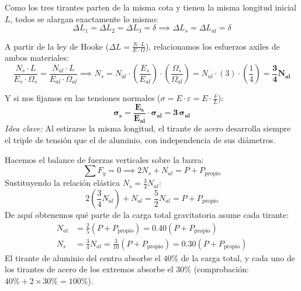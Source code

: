 Como los tres tirantes parten de la misma cota y tienen la misma longitud inicial $L$, todos se alargan exactamente lo mismo:
\begin{equation}
    \Delta L_1 = \Delta L_2 = \Delta L_3 = \delta \implies \Delta L_s = \Delta L_{al} = \delta
\end{equation}

A partir de la ley de Hooke ($\Delta L = \frac{N \cdot L}{E \cdot \Omega}$), relacionamos los esfuerzos axiles de ambos materiales:
\begin{equation}
    \frac{N_s \cdot L}{E_s \cdot \Omega_s} = \frac{N_{al} \cdot L}{E_{al} \cdot \Omega_{al}} \implies N_s = N_{al} \cdot \left(\frac{E_s}{E_{al}}\right) \cdot \left(\frac{\Omega_s}{\Omega_{al}}\right) = N_{al} \cdot (3) \cdot \left(\frac{1}{4}\right) = \mathbf{\frac{3}{4} N_{al}}
\end{equation}

Y si nos fijamos en las tensiones normales ($\sigma = E \cdot \varepsilon = E \cdot \frac{\delta}{L}$):
\begin{equation}
    \mathbf{\sigma_s = \frac{E_s}{E_{al}} \cdot \sigma_{al} = 3\,\sigma_{al}}
\end{equation}
\textit{Idea clave:} Al estirarse la misma longitud, el tirante de acero desarrolla siempre el triple de tensión que el de aluminio, con independencia de sus diámetros.


Hacemos el balance de fuerzas verticales sobre la barra:
\begin{equation}
    \sum F_y = 0 \implies 2 N_s + N_{al} = P + P_{\text{propio}}
\end{equation}
Sustituyendo la relación elástica $N_s = \frac{3}{4} N_{al}$:
\begin{equation}
    2\left(\frac{3}{4} N_{al}\right) + N_{al} = \frac{5}{2} N_{al} = P + P_{\text{propio}}
\end{equation}
De aquí obtenemos qué parte de la carga total gravitatoria asume cada tirante:
\begin{align}
    N_{al} & = \frac{2}{5}\left(P + P_{\text{propio}}\right) = 0.40\left(P + P_{\text{propio}}\right) \\
    N_s    & = \frac{3}{4} N_{al} = \frac{3}{10}\left(P + P_{\text{propio}}\right) = 0.30\left(P + P_{\text{propio}}\right)
\end{align}
El tirante de aluminio del centro absorbe el $40\%$ de la carga total, y cada uno de los tirantes de acero de los extremos absorbe el $30\%$ (comprobación: $40\% + 2 \times 30\% = 100\%$).

